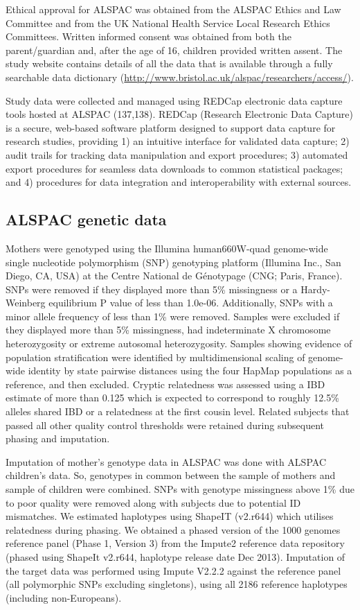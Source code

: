 \documentclass[11pt,oneside]{bristolthesis}
\begin{document}
Ethical approval for ALSPAC was obtained from the ALSPAC Ethics and Law Committee and from the UK National Health Service Local Research Ethics Committees. Written informed consent was obtained from both the parent/guardian and, after the age of 16, children provided written assent. The study website contains details of all the data that is available through a fully searchable data dictionary (\url{http://www.bristol.ac.uk/alspac/researchers/access/}).

Study data were collected and managed using REDCap electronic data capture tools hosted at ALSPAC (137,138). REDCap (Research Electronic Data Capture) is a secure, web-based software platform designed to support data capture for research studies, providing 1) an intuitive interface for validated data capture; 2) audit trails for tracking data manipulation and export procedures; 3) automated export procedures for seamless data downloads to common statistical packages; and 4) procedures for data integration and interoperability with external sources.

\hypertarget{alspac-genetic-data}{%
\subsection{ALSPAC genetic data}\label{alspac-genetic-data}}

Mothers were genotyped using the Illumina human660W-quad genome-wide single nucleotide polymorphism (SNP) genotyping platform (Illumina Inc., San Diego, CA, USA) at the Centre National de Génotypage (CNG; Paris, France). SNPs were removed if they displayed more than 5\% missingness or a Hardy-Weinberg equilibrium P value of less than 1.0e-06. Additionally, SNPs with a minor allele frequency of less than 1\% were removed. Samples were excluded if they displayed more than 5\% missingness, had indeterminate X chromosome heterozygosity or extreme autosomal heterozygosity. Samples showing evidence of population stratification were identified by multidimensional scaling of genome-wide identity by state pairwise distances using the four HapMap populations as a reference, and then excluded. Cryptic relatedness was assessed using a IBD estimate of more than 0.125 which is expected to correspond to roughly 12.5\% alleles shared IBD or a relatedness at the first cousin level. Related subjects that passed all other quality control thresholds were retained during subsequent phasing and imputation.

Imputation of mother's genotype data in ALSPAC was done with ALSPAC children's data. So, genotypes in common between the sample of mothers and sample of children were combined. SNPs with genotype missingness above 1\% due to poor quality were removed along with subjects due to potential ID mismatches. We estimated haplotypes using ShapeIT (v2.r644) which utilises relatedness during phasing. We obtained a phased version of the 1000 genomes reference panel (Phase 1, Version 3) from the Impute2 reference data repository (phased using ShapeIt v2.r644, haplotype release date Dec 2013). Imputation of the target data was performed using Impute V2.2.2 against the reference panel (all polymorphic SNPs excluding singletons), using all 2186 reference haplotypes (including non-Europeans).
\end{document}
